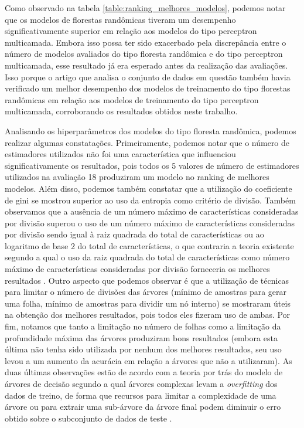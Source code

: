 Como observado na tabela \ref{table:ranking_melhores_modelos}, podemos notar que os modelos de florestas randômicas tiveram um desempenho significativamente superior em relação aos modelos do tipo perceptron multicamada. Embora isso possa ter sido exacerbado pela discrepância entre o número de modelos avaliados do tipo floresta randômica e do tipo perceptron multicamada, esse resultado já era esperado antes da realização das avaliações. Isso porque o artigo \cite{chicco2020} que analisa o conjunto de dados em questão \cite{larxel_dataset} também havia verificado um melhor desempenho dos modelos de treinamento do tipo florestas randômicas em relação aos modelos de treinamento do tipo perceptron multicamada, corroborando os resultados obtidos neste trabalho.

Analisando os hiperparâmetros dos modelos do tipo floresta randômica, podemos realizar algumas constatações. Primeiramente, podemos notar que o número de estimadores utilizados não foi uma característica que influenciou significativamente os resultados, pois todos os 5 valores de número de estimadores utilizados na avaliação 18 produziram um modelo no ranking de melhores modelos. Além disso, podemos também constatar que a utilização do coeficiente de gini se mostrou superior ao uso da entropia como critério de divisão. Também observamos que a ausência de um número máximo de características consideradas por divisão superou o uso de um número máximo de características consideradas por divisão sendo igual à raiz quadrada do total de características ou ao logaritmo de base 2 do total de características, o que contraria a teoria existente segundo a qual o uso da raiz quadrada do total de características como número máximo de características consideradas por divisão forneceria os melhores resultados \cite[p.319-321]{statistical_learning}. Outro aspecto que podemos observar é que a utilização de técnicas para limitar o número de divisões das árvores (mínimo de amostras para gerar uma folha, mínimo de amostras para dividir um nó interno) se mostraram úteis na obtenção dos melhores resultados, pois todos eles fizeram uso de ambas. Por fim, notamos que tanto a limitação no número de folhas como a limitação da profundidade máxima das árvores produziram bons resultados (embora esta última não tenha sido utilizada por nenhum dos melhores resultados, seu uso levou a um aumento da acurácia em relação a árvores que não a utilizaram). As duas últimas observações estão de acordo com a teoria por trás do modelo de árvores de decisão segundo a qual árvores complexas levam a \textit{overfitting} dos dados de treino, de forma que recursos para limitar a complexidade de uma árvore ou para extrair uma sub-árvore da árvore final podem diminuir o erro obtido sobre o subconjunto de dados de teste \cite[p.307-311]{statistical_learning}.

